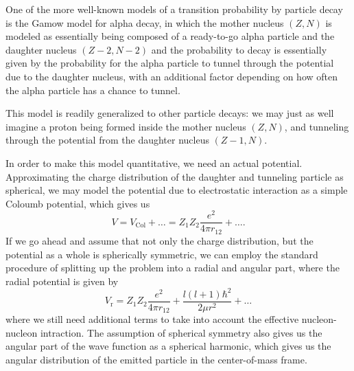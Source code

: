 One of the more well-known models of a transition probability by particle decay is the Gamow model for alpha decay, in which the mother nucleus $(Z,N)$ is modeled as essentially being composed of a ready-to-go alpha particle and the daughter nucleus $(Z-2,N-2)$ and the probability to decay is essentially given by the probability for the alpha particle to tunnel through the potential due to the daughter nucleus, with an additional factor depending on how often the alpha particle has a chance to tunnel. 

This model is readily generalized to other particle decays: we may just as well imagine a proton being formed inside the mother nucleus $(Z,N)$, and tunneling through the potential from the daughter nucleus $(Z-1,N)$.

In order to make this model quantitative, we need an actual potential. Approximating the charge distribution of the daughter and tunneling particle as spherical, we may model the potential due to electrostatic interaction as a simple Coloumb potential, which gives us
\begin{equation}
V = V_\text{Col} + \dots =  Z_1 Z_2 \frac{e^2}{4\pi r_{12}} + \dots.
\end{equation}
If we go ahead and assume that not only the charge distribution, but the potential as a whole is spherically symmetric, we can employ the standard procedure of splitting up the problem into a radial and angular part, where the radial potential is given by
\begin{equation}
V_\text{r} = Z_1 Z_2 \frac{e^2}{4\pi r_{12}} + \frac{l(l+1)\hbar^2}{2\mu r^2} + \dots
\end{equation}
where we still need additional terms to take into account the effective nucleon-nucleon intraction. The assumption of spherical symmetry also gives us the angular part of the wave function as a spherical harmonic, which gives us the angular distribution of the emitted particle in the center-of-mass frame.
